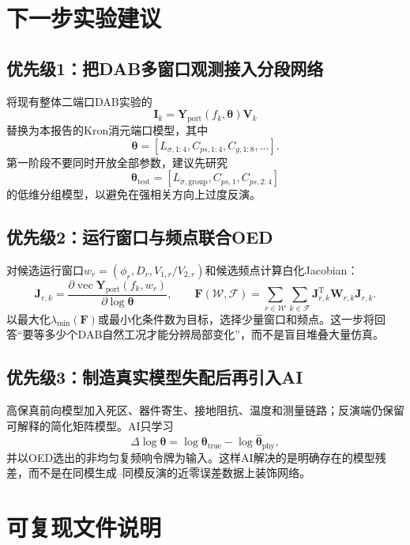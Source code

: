 \documentclass[UTF8,12pt,a4paper]{ctexart}
\newcommand{\Yp}{\bm{Y}_{\mathrm{port}}}
\begin{document}
\section{下一步实验建议}

\subsection{优先级1：把DAB多窗口观测接入分段网络}
将现有整体二端口DAB实验的
\[
\bm{I}_k=\Yp(f_k,\bm{\theta})\bm{V}_k
\]
替换为本报告的Kron消元端口模型，其中
\[
\bm{\theta}
=[L_{\sigma,1:4},C_{ps,1:4},C_{g,1:8},\ldots].
\]
第一阶段不要同时开放全部参数，建议先研究
\[
\bm{\theta}_{\mathrm{test}}
=[L_{\sigma,\mathrm{group}},C_{ps,1},C_{ps,2:4}]
\]
的低维分组模型，以避免在强相关方向上过度反演。

\subsection{优先级2：运行窗口与频点联合OED}
对候选运行窗口\(w_r=(\phi_r,D_r,V_{1,r}/V_{2,r})\)和候选频点计算白化Jacobian：
\[
\bm{J}_{r,k}
=\frac{\partial\operatorname{vec}\Yp(f_k,w_r)}
{\partial\log\bm{\theta}},
\qquad
\bm{F}(\mathcal{W},\mathcal{F})
=\sum_{r\in\mathcal{W}}\sum_{k\in\mathcal{F}}
\bm{J}_{r,k}^{\mathrm T}\bm{W}_{r,k}\bm{J}_{r,k}.
\]
以最大化\(\lambda_{\min}(\bm{F})\)或最小化条件数为目标，选择少量窗口和频点。这一步将回答“要等多少个DAB自然工况才能分辨局部变化”，而不是盲目堆叠大量仿真。

\subsection{优先级3：制造真实模型失配后再引入AI}
高保真前向模型加入死区、器件寄生、接地阻抗、温度和测量链路；反演端仍保留可解释的简化矩阵模型。AI只学习
\[
\Delta\log\bm{\theta}
=\log\bm{\theta}_{\mathrm{true}}
-\log\hat{\bm{\theta}}_{\mathrm{phy}},
\]
并以OED选出的非均匀复频响令牌为输入。这样AI解决的是明确存在的模型残差，而不是在同模生成--同模反演的近零误差数据上装饰网络。

\section{可复现文件说明}
\end{document}
